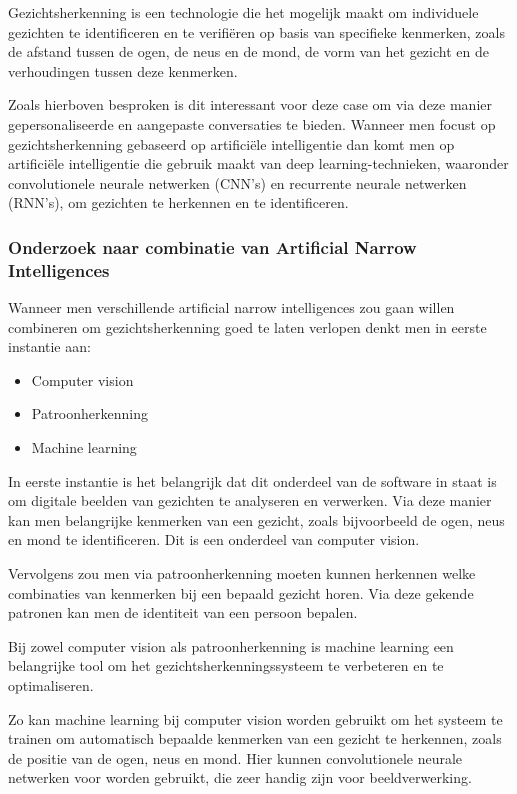 Gezichtsherkenning is een technologie die het mogelijk maakt om individuele gezichten te identificeren en te verifiëren op basis van specifieke kenmerken, zoals de afstand tussen de ogen, de neus en de mond, de vorm van het gezicht en de verhoudingen tussen deze kenmerken.

Zoals hierboven besproken is dit interessant voor deze case om via deze manier gepersonaliseerde en aangepaste conversaties te bieden. Wanneer men focust op gezichtsherkenning gebaseerd op artificiële intelligentie dan komt men op  artificiële intelligentie die gebruik maakt van deep learning-technieken, waaronder convolutionele neurale netwerken (CNN's) en recurrente neurale netwerken (RNN's), om gezichten te herkennen en te identificeren.

\subsubsection{Onderzoek naar combinatie van Artificial Narrow Intelligences}

Wanneer men verschillende artificial narrow intelligences zou gaan willen combineren om gezichtsherkenning goed te laten verlopen denkt men in eerste instantie aan:

\begin{itemize}
    \item Computer vision
    \item Patroonherkenning
    \item Machine learning
\end{itemize}

In eerste instantie is het belangrijk dat dit onderdeel van de software in staat is om digitale beelden van gezichten te analyseren en verwerken. Via deze manier kan men belangrijke kenmerken van een gezicht, zoals bijvoorbeeld de ogen, neus en mond te identificeren. Dit is een onderdeel van computer vision.

Vervolgens zou men via patroonherkenning moeten kunnen herkennen welke combinaties van kenmerken bij een bepaald gezicht horen. Via deze gekende patronen kan men de identiteit van een persoon bepalen.

Bij zowel computer vision als patroonherkenning is machine learning een belangrijke tool om het gezichtsherkenningssysteem te verbeteren en te optimaliseren.

Zo kan machine learning bij computer vision worden gebruikt om het systeem te trainen om automatisch bepaalde kenmerken van een gezicht te herkennen, zoals de positie van de ogen, neus en mond. Hier kunnen convolutionele neurale netwerken voor worden gebruikt, die zeer handig zijn voor beeldverwerking.

